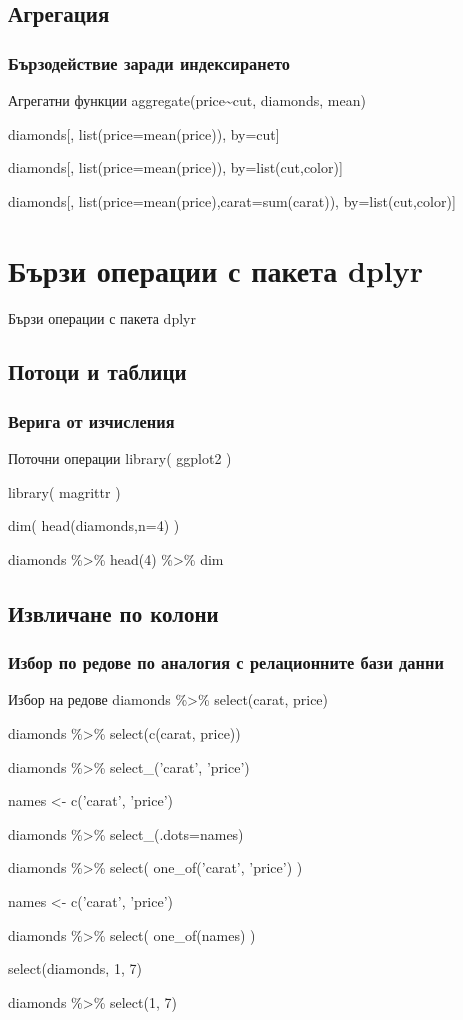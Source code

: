 \documentclass{beamer}
\begin{document}
\subsection{Агрегация}

\begin{frame}
\frametitle{Бързодействие заради индексирането}
\begin{block}{Агрегатни функции}
aggregate(price\textasciitilde cut, diamonds, mean)

diamonds[, list(price=mean(price)), by=cut]

diamonds[, list(price=mean(price)), by=list(cut,color)]

diamonds[, list(price=mean(price),carat=sum(carat)), by=list(cut,color)]
\end{block}
\end{frame}

\section{Бързи операции с пакета dplyr}

\begin{frame}
\center \huge{Бързи операции с пакета dplyr}
\end{frame}

\subsection{Потоци и таблици}

\begin{frame}
\frametitle{Верига от изчисления}
\begin{block}{Поточни операции}
library( ggplot2 )

library( magrittr )
 
dim( head(diamonds,n=4) )
 
diamonds \%>\% head(4) \%>\% dim
\end{block}
\end{frame}

\subsection{Извличане по колони}

\begin{frame}
\frametitle{Избор по редове по аналогия с релационните бази данни}
\begin{block}{Избор на редове}
diamonds \%>\% select(carat, price)

diamonds \%>\% select(c(carat, price))

diamonds \%>\% select\_('carat', 'price')

names <- c('carat', 'price')

diamonds \%>\% select\_(.dots=names)

diamonds \%>\% select( one\_of('carat', 'price') )

names <- c('carat', 'price')

diamonds \%>\% select( one\_of(names) )

select(diamonds, 1, 7)

diamonds \%>\% select(1, 7)
\end{block}
\end{frame}
\end{document}
